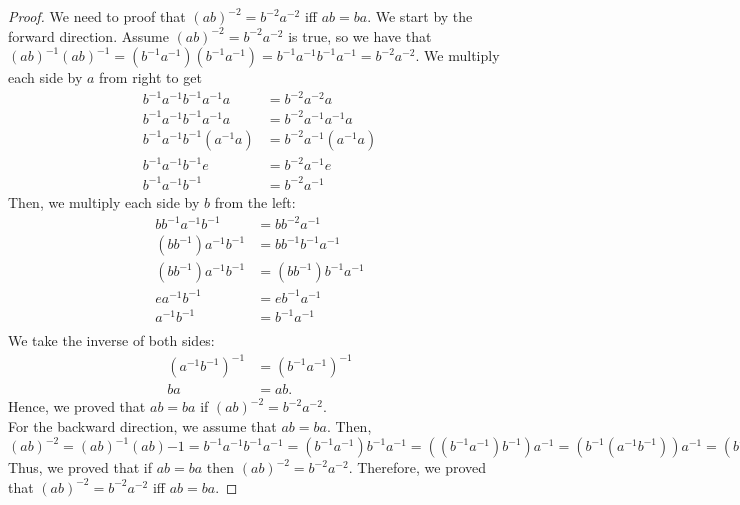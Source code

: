\documentclass[a4paper,12pt]{article}
\begin{document}
\begin{proof}
    We need to proof that $(ab)^{-2}=b^{-2}a^{-2}$ iff $ab=ba.$ We start by the forward direction. Assume $(ab)^{-2}=b^{-2}a^{-2}$ is true, so we have that $(ab)^{-1}(ab)^{-1}=(b^{-1}a^{-1})(b^{-1}a^{-1})=b^{-1}a^{-1}b^{-1}a^{-1}=b^{-2}a^{-2}.$ We multiply each side by $a$ from right to get 
    \begin{align*}b^{-1}a^{-1}b^{-1}a^{-1}a&=b^{-2}a^{-2}a\\b^{-1}a^{-1}b^{-1}a^{-1}a&=b^{-2}a^{-1}a^{-1}a\\b^{-1}a^{-1}b^{-1}(a^{-1}a)&=b^{-2}a^{-1}(a^{-1}a)\\b^{-1}a^{-1}b^{-1}e&=b^{-2}a^{-1}e\\b^{-1}a^{-1}b^{-1}&=b^{-2}a^{-1}
    \end{align*}
    Then, we multiply each side by $b$ from the left:
    \begin{align*}
        bb^{-1}a^{-1}b^{-1}&=bb^{-2}a^{-1}\\
        (bb^{-1})a^{-1}b^{-1}&=bb^{-1}b^{-1}a^{-1}\\
        (bb^{-1})a^{-1}b^{-1}&=(bb^{-1})b^{-1}a^{-1}\\
        ea^{-1}b^{-1}&=eb^{-1}a^{-1}\\
        a^{-1}b^{-1}&=b^{-1}a^{-1}\\
    \end{align*}
    We take the inverse of both sides:
    \begin{align*}
        (a^{-1}b^{-1})^{-1}&=(b^{-1}a^{-1})^{-1}\\
        ba&=ab.
    \end{align*}
    Hence, we proved that $ab=ba$ if $(ab)^{-2}=b^{-2}a^{-2}$.\\
    For the backward direction, we assume that $ab=ba$. Then, $(ab)^{-2}=(ab)^{-1}(ab){-1}=b^{-1}a^{-1}b^{-1}a^{-1}=(b^{-1}a^{-1})b^{-1}a^{-1}=((b^{-1}a^{-1})b^{-1})a^{-1}=(b^{-1}(a^{-1}b^{-1}))a^{-1}=(b^{-1}(b^{-1}a^{-1}))a^{-1}=((b^{-1}b^{-1})a^{-1})a^{-1}=(b^{-2}a^{-1})a^{-1}=b^{-2}a^{-1}a^{-1}=b^{-2}a^{-2}.$ Thus, we proved that if $ab=ba$ then $(ab)^{-2}=b^{-2}a^{-2}.$ Therefore, we proved that $(ab)^{-2}=b^{-2}a^{-2}$ iff $ab=ba.$
\end{proof}
\end{document}
